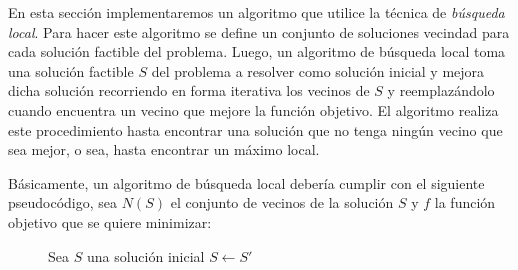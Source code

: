 En esta sección implementaremos un algoritmo que utilice la técnica de \emph{búsqueda local}. Para hacer este algoritmo se define un conjunto de soluciones vecindad para cada solución factible del problema. Luego, un algoritmo de búsqueda local toma una solución factible $S$ del problema a resolver como solución inicial y mejora dicha solución recorriendo en forma iterativa los vecinos de $S$ y reemplazándolo cuando encuentra un vecino que mejore la función objetivo. El algoritmo realiza este procedimiento hasta encontrar una solución que no tenga ningún vecino que sea mejor, o sea, hasta encontrar un máximo local.

Básicamente, un algoritmo de búsqueda local debería cumplir con el siguiente pseudocódigo, sea $N(S)$ el conjunto de vecinos de la solución $S$ y $f$ la función objetivo que se quiere minimizar:

\begin{center}
 \begin{figure}[H]
  \begin{pseudo}
   \State Sea $S$ una solución inicial
      \State $S \leftarrow S'$
   \EndWhile
   \EndProcedure
  \end{pseudo}
 \end{figure}
\end{center}
